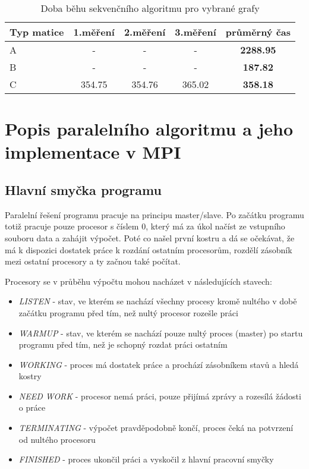 \documentclass[]{article}
\begin{document}
\begin{table}[ht]
\centering
\begin{tabular}{|l|c|c|c|c|}
\hline \textbf{Typ matice} & \textbf{1.měření} & \textbf{2.měření} & \textbf{3.měření} & \textbf{průměrný čas} \\
\hline 
\hline A & - & - & - & \textbf{2288.95} \\ 
\hline B & - & - & - & \textbf{187.82} \\ 
\hline C & 354.75 & 354.76 & 365.02 & \textbf{358.18} \\ 
\hline 
\end{tabular}
\caption{Doba běhu sekvenčního algoritmu pro vybrané grafy}
\label{sekvencni_test}	
\end{table}

\section{Popis paralelního algoritmu a jeho implementace v MPI}

\subsection{Hlavní smyčka programu}
Paralelní řešení programu pracuje na principu master/slave. Po začátku programu totiž pracuje pouze procesor s číslem 0, který má za úkol načíst ze vstupního souboru data a zahájit výpočet. Poté co našel první kostru a dá se očekávat, že má k dispozici dostatek práce k rozdání ostatním procesorům, rozdělí zásobník mezi ostatní procesory a ty začnou také počítat.

Procesory se v průběhu výpočtu mohou nacházet v následujících stavech:
\begin{itemize}
  \item \textit{LISTEN} - stav, ve kterém se nachází všechny procesy kromě nultého v době začátku programu před tím, než nultý procesor rozešle práci
  \item \textit{WARMUP} - stav, ve kterém se nachází pouze nultý proces (master) po startu programu před tím, než je schopný rozdat práci ostatním
  \item \textit{WORKING} - proces má dostatek práce a prochází zásobníkem stavů a hledá kostry
  \item \textit{NEED WORK} - procesor nemá práci, pouze přijímá zprávy a rozesílá žádosti o práce
  \item \textit{TERMINATING} - výpočet pravděpodobně končí, proces čeká na potvrzení od nultého procesoru
  \item \textit{FINISHED} - proces ukončil práci a vyskočil z hlavní pracovní smyčky
\end{itemize}
\end{document}
